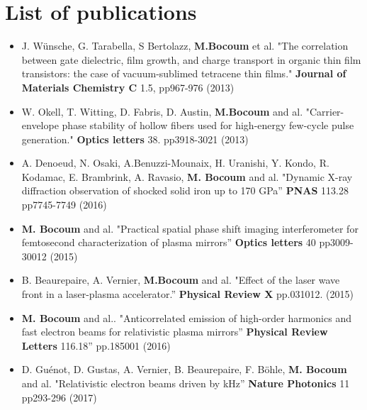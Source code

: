 \documentclass[11pt,a4paper,sans]{moderncv} %
\begin{document}
\section{List of publications}

\renewcommand{\listitemsymbol}{-~} %

\begin{itemize}
\item J. Wünsche, G. Tarabella, S Bertolazz, \textbf{M.Bocoum} et al. "The correlation between gate dielectric, film growth, and charge transport in organic thin film transistors: the case of vacuum-sublimed tetracene thin films."  \textbf{Journal of Materials Chemistry C}  1.5, pp967-976  (2013) 

\item W. Okell, T. Witting, D. Fabris, D. Austin, \textbf{M.Bocoum} and al. "Carrier-envelope phase stability of hollow fibers used for high-energy few-cycle pulse generation." \textbf{Optics letters} 38. pp3918-3021 (2013)

\item A. Denoeud, N. Osaki, A.Benuzzi-Mounaix, H. Uranishi, Y. Kondo, R. Kodamac, E. Brambrink, A. Ravasio, \textbf{M. Bocoum} and al. "Dynamic X-ray diffraction observation of shocked solid iron up to 170 GPa” \textbf{PNAS} 113.28 pp7745-7749 (2016)

\item \textbf{M. Bocoum} and al. "Practical spatial phase shift imaging interferometer for femtosecond characterization of plasma mirrors” \textbf{Optics letters} 40 pp3009-30012 (2015)

\item B. Beaurepaire, A. Vernier, \textbf{M.Bocoum} and al. "Effect of the laser wave front in a laser-plasma accelerator.” \textbf{Physical Review X} pp.031012. (2015)

\item \textbf{M. Bocoum}  and al.. "Anticorrelated emission of high-order harmonics and fast electron beams for relativistic plasma mirrors”  \textbf{Physical Review Letters} 116.18” pp.185001  (2016)

\item  D. Guénot, D. Gustas, A. Vernier, B. Beaurepaire, F. Böhle, \textbf{M. Bocoum} and al. "Relativistic electron beams driven by kHz” \textbf{Nature Photonics} 11 pp293-296 (2017)

\end{itemize}

\end{document}
